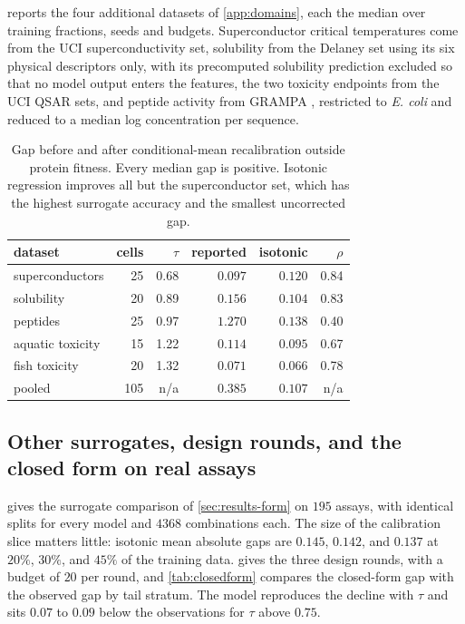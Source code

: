 \documentclass{article}
\theoremstyle{plain}
\theoremstyle{definition}
\begin{document}
 reports the four additional datasets of
\cref{app:domains}, each the median over training fractions, seeds and budgets.
Superconductor critical temperatures come from the UCI superconductivity set, solubility
from the Delaney set using its six physical descriptors only, with its precomputed
solubility prediction excluded so that no model output enters the features, the two
toxicity endpoints from the UCI QSAR sets, and peptide activity from GRAMPA
\citep{witten2019deep}, restricted to \emph{E. coli} and reduced to a median log
concentration per sequence.

\begin{table}[ht]
\caption{Gap before and after conditional-mean recalibration outside protein fitness.
Every median gap is positive. Isotonic regression improves all but the superconductor
set, which has the highest surrogate accuracy and the smallest uncorrected gap.}
\label{tab:domains}
\vskip 0.1in
\begin{center}
\begin{small}
\begin{tabular}{lrrrrr}
\toprule
dataset & cells & $\tau$ & reported & isotonic & $\rho$ \\
\midrule
superconductors & 25 & 0.68 & $0.097$ & $0.120$ & 0.84 \\
solubility      & 20 & 0.89 & $0.156$ & $0.104$ & 0.83 \\
peptides        & 25 & 0.97 & $1.270$ & $0.138$ & 0.40 \\
aquatic toxicity & 15 & 1.22 & $0.114$ & $0.095$ & 0.67 \\
fish toxicity   & 20 & 1.32 & $0.071$ & $0.066$ & 0.78 \\
\midrule
pooled          & 105 & n/a & $0.385$ & $0.107$ & n/a \\
\bottomrule
\end{tabular}
\end{small}
\end{center}
\vskip -0.1in
\end{table}

\subsection{Other surrogates, design rounds, and the closed form on real assays}
\label{app:form}

 gives the surrogate comparison of \cref{sec:results-form} on
$195$ assays, with identical splits for every model and $4368$ combinations each. The
size of the calibration slice matters little: isotonic mean absolute gaps are $0.145$,
$0.142$, and $0.137$ at $20\%$, $30\%$, and $45\%$ of the training data.
 gives the three design rounds, with a budget of $20$ per round, and
\cref{tab:closedform} compares the closed-form gap with the observed gap by tail
stratum. The model reproduces the decline with $\tau$ and sits $0.07$ to $0.09$ below
the observations for $\tau$ above $0.75$.
\end{document}
